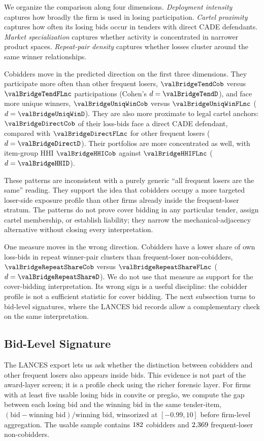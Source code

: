 We organize the comparison along four dimensions.
\emph{Deployment intensity} captures how broadly the firm is
used in losing participation. \emph{Cartel proximity} captures
how often its losing bids occur in tenders with direct CADE
defendants. \emph{Market specialization} captures whether
activity is concentrated in narrower product spaces.
\emph{Repeat-pair density} captures whether losses cluster
around the same winner relationships.

Cobidders move in the predicted direction on the first three
dimensions. They participate more often than other frequent
losers, $\valBridgeTendCob$ versus $\valBridgeTendFLnc$
participations (Cohen's $d=\valBridgeTendD$), and face more
unique winners, $\valBridgeUniqWinCob$ versus
$\valBridgeUniqWinFLnc$ ($d=\valBridgeUniqWinD$). They are also
more proximate to legal cartel anchors: $\valBridgeDirectCob$
of their loss-bids face a direct CADE defendant, compared with
$\valBridgeDirectFLnc$ for other frequent losers
($d=\valBridgeDirectD$). Their portfolios are more concentrated
as well, with item-group HHI $\valBridgeHHICob$ against
$\valBridgeHHIFLnc$ ($d=\valBridgeHHID$).

These patterns are inconsistent with a purely generic ``all
frequent losers are the same'' reading. They support the idea
that cobidders occupy a more targeted loser-side exposure
profile than other firms already inside the frequent-loser
stratum. The patterns do not prove cover bidding in any
particular tender, assign cartel membership, or establish
liability; they narrow the mechanical-adjacency alternative
without closing every interpretation.

One measure moves in the wrong direction. Cobidders have a
lower share of own loss-bids in repeat winner-pair clusters
than frequent-loser non-cobidders, $\valBridgeRepeatShareCob$
versus $\valBridgeRepeatShareFLnc$
($d=\valBridgeRepeatShareD$). We do not use that measure as
support for the cover-bidding interpretation. Its wrong sign is
a useful discipline: the cobidder profile is not a sufficient
statistic for cover bidding. The next subsection turns to
bid-level signatures, where the LANCES bid records allow a
complementary check on the same interpretation.

\subsection{Bid-Level Signature}
\label{sec:cobidder_bid}

The LANCES export lets us ask whether the distinction between
cobidders and other frequent losers also appears inside bids.
This evidence is not part of the award-layer screen; it is a
profile check using the richer forensic layer. For firms with
at least five usable losing bids in convite or pregão, we
compute the gap between each losing bid and the winning bid in
the same tender-item,
$(\text{bid}-\text{winning bid})/\text{winning bid}$,
winsorized at $[-0.99,10]$ before firm-level aggregation. The
usable sample contains $182$ cobidders and
$2{,}369$ frequent-loser non-cobidders.

